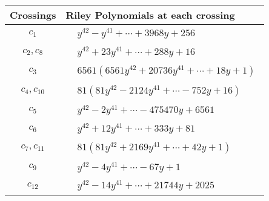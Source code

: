 \documentclass[1p]{elsarticle_modified}
\theoremstyle{definition}
\begin{document}
\begin{tabular}{m{50pt}|m{274pt}}
Crossings & \hspace{64pt}Riley Polynomials at each crossing \\
\hline $$\begin{aligned}c_{1}\end{aligned}$$&$\begin{aligned}
&y^{42}- y^{41}+\cdots+3968 y+256
\end{aligned}$\\
\hline $$\begin{aligned}c_{2},c_{8}\end{aligned}$$&$\begin{aligned}
&y^{42}+23 y^{41}+\cdots+288 y+16
\end{aligned}$\\
\hline $$\begin{aligned}c_{3}\end{aligned}$$&$\begin{aligned}
&6561(6561 y^{42}+20736 y^{41}+\cdots+18 y+1)
\end{aligned}$\\
\hline $$\begin{aligned}c_{4},c_{10}\end{aligned}$$&$\begin{aligned}
&81(81 y^{42}-2124 y^{41}+\cdots-752 y+16)
\end{aligned}$\\
\hline $$\begin{aligned}c_{5}\end{aligned}$$&$\begin{aligned}
&y^{42}-2 y^{41}+\cdots-475470 y+6561
\end{aligned}$\\
\hline $$\begin{aligned}c_{6}\end{aligned}$$&$\begin{aligned}
&y^{42}+12 y^{41}+\cdots+333 y+81
\end{aligned}$\\
\hline $$\begin{aligned}c_{7},c_{11}\end{aligned}$$&$\begin{aligned}
&81(81 y^{42}+2169 y^{41}+\cdots+42 y+1)
\end{aligned}$\\
\hline $$\begin{aligned}c_{9}\end{aligned}$$&$\begin{aligned}
&y^{42}-4 y^{41}+\cdots-67 y+1
\end{aligned}$\\
\hline $$\begin{aligned}c_{12}\end{aligned}$$&$\begin{aligned}
&y^{42}-14 y^{41}+\cdots+21744 y+2025
\end{aligned}$\\
\hline
\end{tabular}\\~\\
\end{document}
